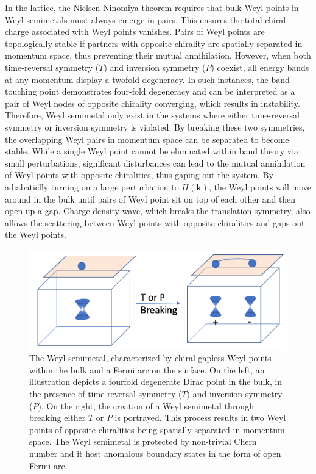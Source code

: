 In the lattice, the Nielsen-Ninomiya theorem requires that bulk Weyl
points in Weyl semimetals must always emerge in pairs. This ensures the total chiral charge associated with Weyl points vanishes\cite{nielsen1983adler}. Pairs of Weyl points are topologically stable if partners with opposite chirality are spatially separated in momentum space, thus preventing their mutual annihilation. However, when both time-reversal symmetry ($T$) and inversion symmetry ($P$) coexist, all energy bands at any momentum display a twofold degeneracy.  In such instances, the band touching point demonstrates four-fold degeneracy and can be interpreted as a pair of Weyl nodes of opposite chirality converging, which results in instability\cite{gao2016classification}. Therefore, Weyl semimetal only exist in the systems where either time-reversal symmetry or inversion symmetry is violated. By breaking these two symmetries, the overlapping Weyl pairs in momentum space can be separated to become stable. While a single Weyl point cannot be eliminated within band theory via small perturbations, significant disturbances can lead to the mutual annihilation of Weyl points with opposite chiralities, thus gaping out the system. By adiabaticlly turning on a large perturbation to $H(\mathbf{k})$, the Weyl points will move around in the bulk until pairs of Weyl point sit on top of each other and then open up a gap. Charge density wave, which breaks the translation symmetry, also allows the scattering between Weyl points with opposite chiralities and gaps out the Weyl points. 

 \begin{figure}[h]
    \centering
    \includegraphics[width =\textwidth]{images/Weyl.png}
    \caption{ The Weyl semimetal, characterized by chiral gapless Weyl points within the bulk and a Fermi arc on the surface.
    On the left, an illustration depicts a fourfold degenerate Dirac point in the bulk, in the presence of time reversal symmetry ($T$) and inversion symmetry ($P$). 
    On the right, the creation of a Weyl semimetal through breaking either $T$ or $P$ is portrayed. This process results in two Weyl points of opposite chiralities being spatially separated in momentum space. The Weyl semimetal is protected by non-trivial Chern number and it host anomalous boundary states in the form of open Fermi arc.}
    \label{fig:Weyl}
\end{figure}

